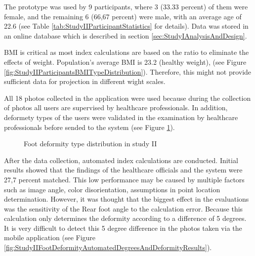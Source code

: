 The prototype was used by 9 participants, where 3 (33.33 percent) of them were female, and the remaining 6 (66,67 percent) were male, with an average age of 22.6 (see Table \ref{tab:StudyIIParticipantStatistics} for details). Data was stored in an online database which is described in section \ref{sec:StudyIAnalysisAndDesign}.

BMI is critical as most index calculations are based on the ratio to eliminate the effects of weight. Population's average BMI is 23.2 (healthy weight), (see Figure \ref{fig:StudyIIParticipantsBMITypeDistribution}). Therefore, this might not provide sufficient data for projection in different wight scales.

All 18 photos collected in the application were used because during the collection of photos all users are supervised by healthcare professionals. In addition, deformety types of the users were validated in the examination by healthcare professionals before sended to the system (see Figure  \ref{fig:StudyIIFootDeformityTypeDistribution}).

\begin{figure}[htbp]
\centering
{}
\caption{Foot deformity type distribution in study II}
\label{fig:StudyIIFootDeformityTypeDistribution}
\end{figure} 


After the data collection, automated index calculations are conducted. Initial results showed that the findings of the healthcare officials and the system were 27,7 percent matched. This low performance may be caused by multiple factors such as image angle, color disorientation, assumptions in point location determination. However, it was thought that the biggest effect in the evaluations was the sensitivity of the Rear foot angle to the calculation error. Because this calculation only determines the deformity according to a difference of 5 degrees. It is very difficult to detect this 5 degree difference in the photos taken via the mobile application (see Figure \ref{fig:StudyIIFootDeformityAutomatedDegreesAndDeformityResults}). 

